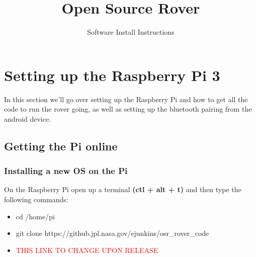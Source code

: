 \documentclass[12pt]{article}
\begin{document}
\title{Open Source Rover}
\author{Software Install Instructions}

\makeatletter         
\def\@maketitle{
\begin{center}	
	\makebox[\textwidth][c]{ \texttt{[image: "Pictures/software title".png]}}
	{\Huge \bfseries \sffamily \@title }\\[4ex] 
	{\huge \bfseries \sffamily \@author}\\[4ex] 
	\texttt{[image: "Pictures/JPL logo".png]}
\end{center}}
\makeatother

\maketitle

\newpage


\tableofcontents

\newpage


\section{Setting up the Raspberry Pi 3}
In this section we'll go over setting up the Raspberry Pi and how to get all the code to run the rover going, as well as setting up the bluetooth pairing from the android device.
\subsection{Getting the Pi online}

\subsubsection{Installing a new OS on the Pi}

On the Raspberry Pi open up a terminal \textbf{(ctl + alt + t)} and then type the following commands:

\begin{itemize}
	\item[] cd /home/pi
	\item[] git clone https://github.jpl.nasa.gov/ejunkins/osr\_rover\_code
	\item[] \textcolor{red}{THIS LINK TO CHANGE UPON RELEASE}
\end{itemize}
\end{document}
